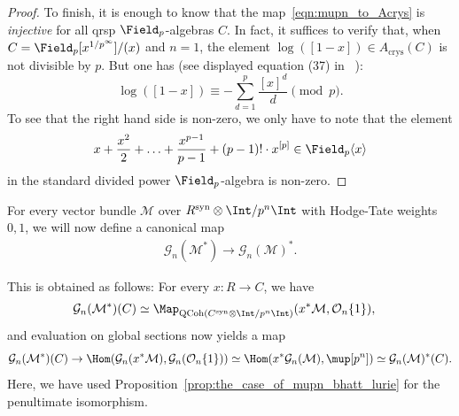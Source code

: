 \documentclass[10pt]{amsart}
\begin{document}
\begin{proof}
To finish, it is enough to know that the map~\eqref{eqn:mupn_to_Acrys} is \emph{injective} for all qrsp $\Field_p$-algebras $C$. In fact, it suffices to verify that, when $C = \Field_p[x^{1/p^\infty}]/(x)$ and $n=1$, the element $\log([1-x])\in A_{\mathrm{crys}}(C)$ is not divisible by $p$. But one has (see displayed equation (37) in ~\cite[p. 168]{bhatt2022absolute}):
\[
\log([1-x]) \equiv -\sum_{d=1}^{p}\frac{[x]^d}{d}\pmod{p}.
\]
To see that the right hand side is non-zero, we only have to note that the element
\[
x + \frac{x^2}{2} + \ldots + \frac{x^{p-1}}{p-1} + (p-1)!\cdot x^{[p]}\in \Field_p\langle x\rangle
\]
in the standard divided power $\Field_p$-algebra is non-zero.

\end{proof}

\begin{construction}
For every vector bundle $\mathcal{M}$ over $R^{\mathrm{syn}}\otimes\Int/p^n\Int$ with Hodge-Tate weights $0,1$, we will now define a canonical map
\begin{align}
\label{eqn:cartier_dual_arrow}
\mathcal{G}_n(\mathcal{M}^*)\to \mathcal{G}_n(\mathcal{M})^*.
\end{align} 

This is obtained as follows: For every $x:R\to C$, we have
\begin{align*}
\mathcal{G}_n(\mathcal{M}^*)(C)&\simeq \Map_{\mathrm{QCoh}(C^{\mathrm{syn}}\otimes\Int/p^n\Int)}(x^*\mathcal{M}, \mathcal{O}_n\{1\}),
\end{align*}
and evaluation on global sections now yields a map
\[
\mathcal{G}_n(\mathcal{M}^*)(C)\to \Hom(\mathcal{G}_n(x^*\mathcal{M}),\mathcal{G}_n(\mathcal{O}_n\{1\}))\simeq \Hom(x^*\mathcal{G}_n(\mathcal{M}),\mup[p^n])\simeq \mathcal{G}_n(\mathcal{M})^*(C).
\]
Here, we have used Proposition~\ref{prop:the_case_of_mupn_bhatt_lurie} for the penultimate isomorphism.
\end{construction}
\end{document}
